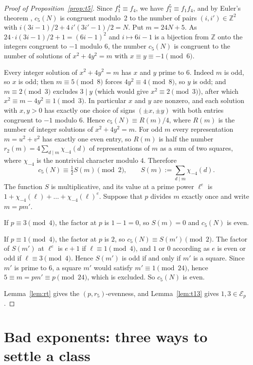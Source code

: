 \documentclass[12pt]{amsart}
\theoremstyle{definition}
\newcommand{\Z}{\mathbb{Z}}
\newcommand{\cE}{\mathcal{E}}
\begin{document}
\begin{proof}[Proof of Proposition~\ref{prop:t5}]
Since $f_1^4\equiv f_4$, we have $f_1^5\equiv f_1f_4$, and by Euler's theorem \cite[Theorem~27]{KZ3}, $c_5(N)$ is congruent modulo~2 to the number of pairs $(i,i')\in\Z^2$ with $i(3i-1)/2+4\,i'(3i'-1)/2=N$. Put $m=24N+5$. As $24\cdot i(3i-1)/2+1=(6i-1)^2$ and $i\mapsto6i-1$ is a bijection from $\Z$ onto the integers congruent to $-1$ modulo $6$, the number $c_5(N)$ is congruent to the number of solutions of $x^2+4y^2=m$ with $x\equiv y\equiv-1\pmod6$.

Every integer solution of $x^2+4y^2=m$ has $x$ and $y$ prime to $6$. Indeed $m$ is odd, so $x$ is odd; then $m\equiv5\pmod8$ forces $4y^2\equiv4\pmod8$, so $y$ is odd; and $m\equiv2\pmod3$ excludes $3\mid y$ (which would give $x^2\equiv2\pmod3$), after which $x^2\equiv m-4y^2\equiv1\pmod3$. In particular $x$ and $y$ are nonzero, and each solution with $x,y>0$ has exactly one choice of signs $(\pm x,\pm y)$ with both entries congruent to $-1$ modulo $6$. Hence $c_5(N)\equiv R(m)/4$, where $R(m)$ is the number of integer solutions of $x^2+4y^2=m$. For odd $m$ every representation $m=u^2+v^2$ has exactly one even entry, so $R(m)$ is half the number $r_2(m)=4\sum_{d\mid m}\chi_{-4}(d)$ of representations of $m$ as a sum of two squares, where $\chi_{-4}$ is the nontrivial character modulo $4$. Therefore
\[
c_5(N)\equiv\tfrac12S(m)\pmod2,\qquad S(m):=\sum_{d\mid m}\chi_{-4}(d).
\]
The function $S$ is multiplicative, and its value at a prime power $\ell^e$ is $1+\chi_{-4}(\ell)+\dots+\chi_{-4}(\ell)^e$. Suppose that $p$ divides $m$ exactly once and write $m=pm'$.

If $p\equiv3\pmod4$, the factor at $p$ is $1-1=0$, so $S(m)=0$ and $c_5(N)$ is even.

If $p\equiv1\pmod4$, the factor at $p$ is $2$, so $c_5(N)\equiv S(m')\pmod2$. The factor of $S(m')$ at $\ell^e$ is $e+1$ if $\ell\equiv1\pmod4$, and $1$ or $0$ according as $e$ is even or odd if $\ell\equiv3\pmod4$. Hence $S(m')$ is odd if and only if $m'$ is a square. Since $m'$ is prime to $6$, a square $m'$ would satisfy $m'\equiv1\pmod{24}$, hence $5\equiv m=pm'\equiv p\pmod{24}$, which is excluded. So $c_5(N)$ is even.

Lemma~\ref{lem:rt} gives the $(p,r_5)$-evenness, and Lemma~\ref{lem:t13} gives $1,3\in\cE_p$.
\end{proof}

\section{Bad exponents: three ways to settle a class}\label{sec:bad}
\end{document}
